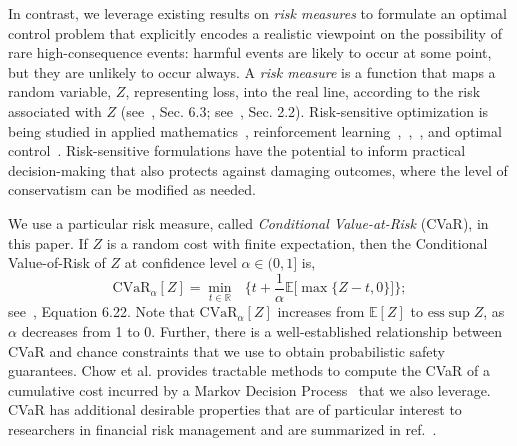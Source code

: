 \documentclass[letterpaper, 10 pt, conference]{ieeeconf}  %
\begin{document}
In contrast, we leverage existing results on \textit{risk measures} to formulate an optimal control problem
that explicitly encodes a realistic viewpoint on the possibility of rare high-consequence events: 
harmful events are likely to occur at some point, but they are unlikely to occur always.
A \textit{risk measure} is a function that maps a random variable, $Z$, representing loss, into the real line,
according to the risk associated with $Z$ (see~\cite{shapiro2009lectures}, Sec. 6.3; see~\cite{kisiala2015conditional}, Sec. 2.2).
Risk-sensitive optimization
is being studied in applied mathematics~\cite{ruszczynski2010risk}, reinforcement learning~\cite{osogami2012robustness},~\cite{chow2015risk},~\cite{ratliff2017risk}, and optimal control~\cite{chow2014framework}.
Risk-sensitive formulations have the potential to inform practical decision-making that also protects against damaging outcomes, where the level of conservatism can be modified as needed.

We use a particular risk measure, called \textit{Conditional Value-at-Risk} (CVaR), in this paper.
If $Z$ is a random cost with finite expectation, then the Conditional Value-of-Risk of $Z$ at confidence level $\alpha \in (0,1]$
is, 
\begin{equation}
\text{CVaR}_\alpha[Z] = {\underset{t \in \mathbb{R}}\min} \text{ }\Big\{ t + \frac{1}{\alpha}\mathbb{E}\big[\max\{Z-t,0\}\big] \Big\};
\label{cvareqn}
\end{equation}
see~\cite{shapiro2009lectures}, Equation 6.22.\footnotemark
{}
Note that $\text{CVaR}_\alpha[Z]$ increases from $\mathbb{E}[Z]$ to $\text{ess}\sup Z$, as $\alpha$ decreases from 1 to 0.\footnotemark
\footnotetext{\textcolor{blue}{The essential supremum of a random variable, $Z$, is the supremum of the realizations of $Z$ that occur with non-zero probability.}}
Further, there is a well-established relationship between CVaR and chance constraints
that we use to obtain probabilistic safety guarantees. 
Chow et al. provides tractable methods to compute the CVaR of a cumulative cost
incurred by a Markov Decision Process~\cite{chow2015risk} that we also leverage.
CVaR has additional desirable properties that are of particular interest to researchers in financial risk management and are summarized in ref.~\cite{serraino2013conditional}. 
\end{document}
